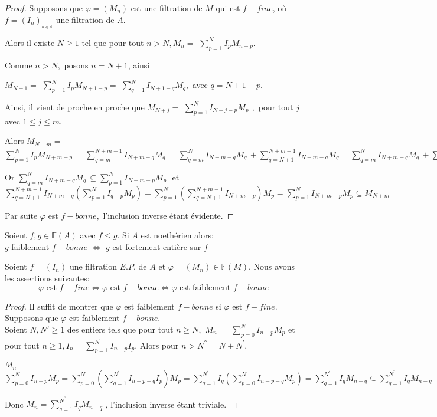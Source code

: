 \begin{proof}
	Supposons que $\varphi =(M_{n})$ est une filtration de $M$ qui est $f-fine$,
	où $f=(I_{n})_{_{n\in \mathbb{N}}}$ une filtration de $A.$
	
	Alors il existe $N\geq 1$ tel que pour tout $n>N,M_{n}=$ $
	\sum\limits_{p=1}^{N}I_{p}M_{n-p}.$
	
	Comme $n>N,$ posons $n=N+1$, ainsi
	
	$M_{N+1}=$ $\sum\limits_{p=1}^{N}I_{p}M_{N+1-p}=$ $\sum\limits_{q=1}^{N}I_{N+1-q}M_{q},$ avec $q=N+1-p.$
	
	Ainsi, il vient de proche en proche que $M_{N+j}=$  $\sum\limits_{p=1}^{N}I_{N+j-p}M_{p}\,\ ,$ pour tout $j$ avec $1\leq j\leq m.$
	
	Alors $M_{N+m}=$ $\sum\limits_{p=1}^{N}I_{p}M_{N+m-p}\,=\sum\limits_{q=m}^{N+m-1}I_{N+m-q}M_{q}\,=\sum\limits_{q=m}^{N}I_{N+m-q}M_{q}\,+\sum\limits_{q=N+1}^{N+m-1}I_{N+m-q}M_{q}=\sum\limits_{q=m}^{N}I_{N+m-q}M_{q}\,+\sum\limits_{q=N+1}^{N+m-1}I_{N+m-q}(\sum\limits_{p=1}^{N}I_{q-p}M_{p}).$
	
	Or $\sum\limits_{q=m}^{N}I_{N+m-q}M_{q}\,\subseteq
	\sum\limits_{p=1}^{N}I_{N+m-p}M_{p}\,$\ et $\sum\limits_{q=N+1}^{N+m-1}I_{N+m-q}(\sum\limits_{p=1}^{N}I_{q-p}M_{p})=\sum\limits_{p=1}^{N}(\sum\limits_{q=N+1}^{N+m-1}I_{N+m-p})M_{p}=\sum\limits_{p=1}^{N}I_{N+m-p}M_{p}\subseteq M_{N+m}$
	
	Par suite $\varphi $ est $f-bonne,$ l'inclusion inverse étant évidente.
\end{proof}
\begin{moncorollaire}
	\label{maprop8}
	Soient $f,g \in \mathbb{F}(A)$ avec $f \leqslant g$. Si $A$ est noethérien alors:\\ 
	$g$ faiblement $f-bonne$ $\Longleftrightarrow$ $g$ est fortement entière sur $f$
\end{moncorollaire}
\begin{maproposition}
	Soient $f=(I_n)$ une filtration $E.P.$ de $A$ et $\varphi=(M_n) \in \mathbb{F}(M)$. Nous avons les assertions suivantes:
	\[ \varphi \text{ est } f-fine \Longleftrightarrow \varphi \text{ est } f-bonne \Longleftrightarrow \varphi \text{ est faiblement } f-bonne   \]
\end{maproposition}
\begin{proof}
	Il suffit de montrer que $\varphi$ est faiblement $f-bonne$ si $\varphi$ est $f-fine$.\\ Supposons que $\varphi$ est faiblement $f-bonne$.\\
	Soient $N, N' \geqslant 1$ des entiers tels que pour tout $n \geqslant N,$
	$M_{n}=$ $\sum\limits_{p=0}^{N}I_{n-p}M_{p}$ et pour tout $n\geq
	1,I_{n}=\sum\limits_{p=1}^{N^{\prime }}I_{n-p}I_{p}.$ Alors pour $n>N^{\prime \prime }=N+N^{\prime},$
	
	$M_{n}=$ $\sum\limits_{p=0}^{N}I_{n-p}M_{p}=\sum\limits_{p=0}^{N}(
	\sum\limits_{q=1}^{N^{\prime
	}}I_{n-p-q}I_{p})M_{p}=\sum\limits_{q=1}^{N^{\prime
	}}I_{q}(\sum\limits_{p=0}^{N}I_{n-p-q}M_{p})=\sum\limits_{q=1}^{N^{\prime
	}}I_{q}M_{n-q}\subseteq \sum\limits_{q=1}^{N^{^{\prime \prime }}}I_{q}M_{n-q}
	$
	
	Donc $M_{n}=\sum\limits_{q=1}^{N^{^{\prime \prime }}}I_{q}M_{n-q}$ ,
	l'inclusion inverse étant triviale. 
\end{proof}
